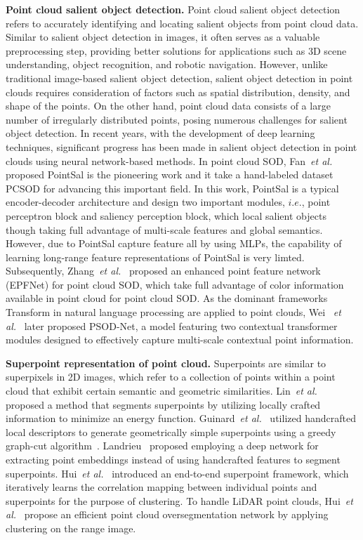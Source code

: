 \noindent\textbf{Point cloud salient object detection.} Point cloud salient object detection refers to accurately identifying and locating salient objects from point cloud data. Similar to salient object detection in images, it often serves as a valuable preprocessing step, providing better solutions for applications such as 3D scene understanding, object recognition, and robotic navigation. However, unlike traditional image-based salient object detection, salient object detection in point clouds requires consideration of factors such as spatial distribution, density, and shape of the points. On the other hand, point cloud data consists of a large number of irregularly distributed points, posing numerous challenges for salient object detection. In recent years, with the development of deep learning techniques, significant progress has been made in salient object detection in point clouds using neural network-based methods. In point cloud SOD, Fan~\emph{et al.}~\cite{fan2022salient} proposed PointSal is the pioneering work and it take a hand-labeled dataset PCSOD for advancing this important field. In this work, PointSal is a typical encoder-decoder architecture and design two important modules, $i.e.$, point perceptron block and saliency perception block, which local salient objects though taking full advantage of multi-scale features and global semantics. However, due to PointSal capture feature all by using MLPs, the capability of learning long-range feature representations of PointSal is very limted. Subsequently, Zhang~\emph{et al.}~\cite{zhang2023enhanced} proposed an enhanced point feature network (EPFNet) for point cloud SOD, which take full advantage of color information available in point cloud for point cloud SOD. As the dominant frameworks Transform in natural language processing are applied to point clouds, Wei ~\emph{et al.}~\cite{wei2024point} later proposed PSOD-Net, a model featuring two contextual transformer modules designed to effectively capture multi-scale contextual point information.

\noindent\textbf{Superpoint representation of point cloud.} Superpoints are similar to superpixels in 2D images, which refer to a collection of points within a point cloud that exhibit certain semantic and geometric similarities. Lin~\emph{et al.}~\cite{lin2018toward} proposed a method that segments superpoints by utilizing locally crafted information to minimize an energy function. Guinard~\emph{et al.}~\cite{guinard2017weakly} utilized handcrafted local descriptors to generate geometrically simple superpoints using a greedy graph-cut algorithm~\cite{landrieu2016cut}. Landrieu~\cite{landrieu2019point} proposed employing a deep network for extracting point embeddings instead of using handcrafted features %
to segment superpoints. Hui~\emph{et al.}~\cite{hui2021superpoint} introduced an end-to-end superpoint framework, which iteratively learns the correlation mapping between individual points and superpoints for the purpose of clustering. To handle LiDAR point clouds, Hui~\emph{et al.}~\cite{hui2023efficient} propose an efficient point cloud oversegmentation network by applying clustering on the range image.